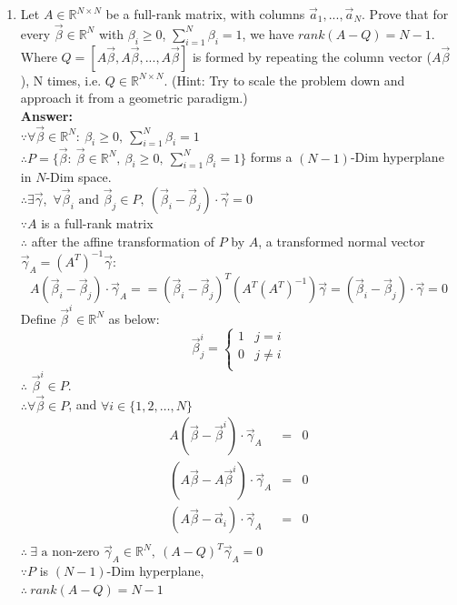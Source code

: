 \documentclass[letterpaper,11pt]{article}
\begin{document}
\begin{enumerate}
\item Let $A \in \mathbb{R}^{N \times N}$ be a full-rank matrix, with columns $\vec{a}_1,...,\vec{a}_N$. Prove that for every $\vec{\beta} \in \mathbb{R}^N$ with $\beta_i \geq 0$, $\sum_{i=1}^{N} \beta_i = 1$, we have $rank(A-Q) = N-1$. Where $Q = [A\vec{\beta}, A\vec{\beta}, ..., A\vec{\beta}]$ is formed by repeating the column vector ($A\vec{\beta}$), N times, i.e. $Q \in \mathbb{R}^{N \times N}$. (Hint: Try to scale the problem down and approach it from a geometric paradigm.)\\
\textbf{Answer:}\\
$\because \forall \vec{\beta} \in \mathbb{R}^N:~\beta_i \geq 0,~\sum_{i=1}^{N}{\beta_i}=1$\\
$\therefore P=\{\vec{\beta}:~\vec{\beta} \in \mathbb{R}^N,~\beta_i \geq 0,~\sum_{i=1}^{N}{\beta_i}=1\}$ forms a $(N-1)$-Dim hyperplane in $N$-Dim space.\\
$\therefore \exists \vec{\gamma}$,~$\forall \vec{\beta}_i \text{ and } \vec{\beta}_j \in P,~(\vec{\beta}_i-\vec{\beta}_j)\cdot\vec{\gamma}=0$\\
$\because A$ is a full-rank matrix\\
$\therefore$ after the affine transformation of $P$ by $A$, a transformed normal vector $\vec{\gamma}_A=(A^T)^{-1}\vec{\gamma}$:
$$A(\vec{\beta}_i-\vec{\beta}_j) \cdot \vec{\gamma}_A==(\vec{\beta}_i-\vec{\beta}_j)^T(A^T(A^T)^{-1})\vec{\gamma}=(\vec{\beta}_i-\vec{\beta}_j)\cdot\vec{\gamma}=0$$
Define $\vec{\beta}^i \in \mathbb{R}^N$ as below:
$$\vec{\beta}^i_j=\left\{\begin{array}{cl}
1 & j = i \\
0 & j \neq i \\
\end{array}\right.$$
$\therefore$ $\vec{\beta}^i \in  P$.\\
$\therefore \forall \vec{\beta} \in P$, and $\forall i \in \{1,2,\dots,N\}$
\begin{equation}
\nonumber
\begin{array}{rcl}
A(\vec{\beta}-\vec{\beta}^i) \cdot \vec{\gamma}_A & = & 0 \\
(A\vec{\beta}-A\vec{\beta}^i) \cdot \vec{\gamma}_A & = & 0 \\
(A\vec{\beta}-\vec{\alpha}_i) \cdot \vec{\gamma}_A & = & 0 \\
\end{array}
\end{equation}
$\therefore~\exists \text{~a non-zero } \vec{\gamma}_A \in \mathbb{R}^N,~(A-Q)^T\vec{\gamma}_A=0$\\
$\because P$ is $(N-1)$-Dim hyperplane,\\
$\therefore~rank(A-Q)=N-1$  

\end{enumerate}
\end{document}
